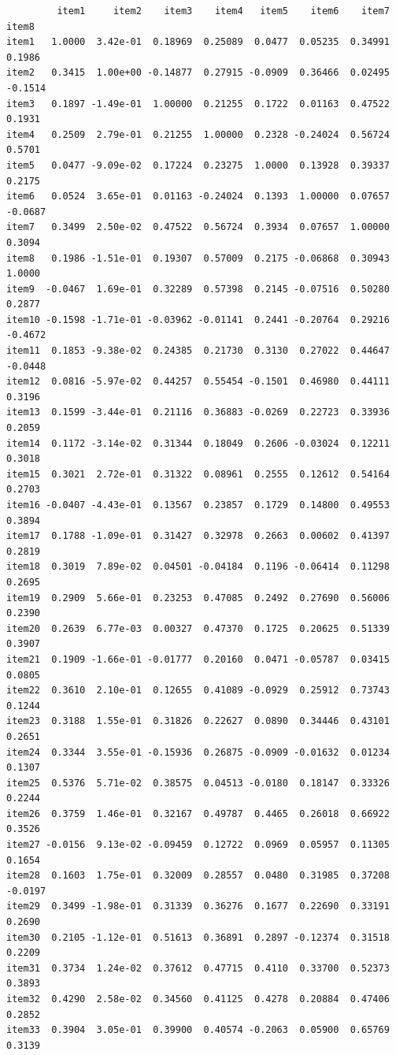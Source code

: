 \documentclass[
  a4paper,
]{ltjsbook}
\begin{document}
\begin{verbatim}
         item1     item2    item3    item4   item5    item6    item7   item8
item1   1.0000  3.42e-01  0.18969  0.25089  0.0477  0.05235  0.34991  0.1986
item2   0.3415  1.00e+00 -0.14877  0.27915 -0.0909  0.36466  0.02495 -0.1514
item3   0.1897 -1.49e-01  1.00000  0.21255  0.1722  0.01163  0.47522  0.1931
item4   0.2509  2.79e-01  0.21255  1.00000  0.2328 -0.24024  0.56724  0.5701
item5   0.0477 -9.09e-02  0.17224  0.23275  1.0000  0.13928  0.39337  0.2175
item6   0.0524  3.65e-01  0.01163 -0.24024  0.1393  1.00000  0.07657 -0.0687
item7   0.3499  2.50e-02  0.47522  0.56724  0.3934  0.07657  1.00000  0.3094
item8   0.1986 -1.51e-01  0.19307  0.57009  0.2175 -0.06868  0.30943  1.0000
item9  -0.0467  1.69e-01  0.32289  0.57398  0.2145 -0.07516  0.50280  0.2877
item10 -0.1598 -1.71e-01 -0.03962 -0.01141  0.2441 -0.20764  0.29216 -0.4672
item11  0.1853 -9.38e-02  0.24385  0.21730  0.3130  0.27022  0.44647 -0.0448
item12  0.0816 -5.97e-02  0.44257  0.55454 -0.1501  0.46980  0.44111  0.3196
item13  0.1599 -3.44e-01  0.21116  0.36883 -0.0269  0.22723  0.33936  0.2059
item14  0.1172 -3.14e-02  0.31344  0.18049  0.2606 -0.03024  0.12211  0.3018
item15  0.3021  2.72e-01  0.31322  0.08961  0.2555  0.12612  0.54164  0.2703
item16 -0.0407 -4.43e-01  0.13567  0.23857  0.1729  0.14800  0.49553  0.3894
item17  0.1788 -1.09e-01  0.31427  0.32978  0.2663  0.00602  0.41397  0.2819
item18  0.3019  7.89e-02  0.04501 -0.04184  0.1196 -0.06414  0.11298  0.2695
item19  0.2909  5.66e-01  0.23253  0.47085  0.2492  0.27690  0.56006  0.2390
item20  0.2639  6.77e-03  0.00327  0.47370  0.1725  0.20625  0.51339  0.3907
item21  0.1909 -1.66e-01 -0.01777  0.20160  0.0471 -0.05787  0.03415  0.0805
item22  0.3610  2.10e-01  0.12655  0.41089 -0.0929  0.25912  0.73743  0.1244
item23  0.3188  1.55e-01  0.31826  0.22627  0.0890  0.34446  0.43101  0.2651
item24  0.3344  3.55e-01 -0.15936  0.26875 -0.0909 -0.01632  0.01234  0.1307
item25  0.5376  5.71e-02  0.38575  0.04513 -0.0180  0.18147  0.33326  0.2244
item26  0.3759  1.46e-01  0.32167  0.49787  0.4465  0.26018  0.66922  0.3526
item27 -0.0156  9.13e-02 -0.09459  0.12722  0.0969  0.05957  0.11305  0.1654
item28  0.1603  1.75e-01  0.32009  0.28557  0.0480  0.31985  0.37208 -0.0197
item29  0.3499 -1.98e-01  0.31339  0.36276  0.1677  0.22690  0.33191  0.2690
item30  0.2105 -1.12e-01  0.51613  0.36891  0.2897 -0.12374  0.31518  0.2209
item31  0.3734  1.24e-02  0.37612  0.47715  0.4110  0.33700  0.52373  0.3893
item32  0.4290  2.58e-02  0.34560  0.41125  0.4278  0.20884  0.47406  0.2852
item33  0.3904  3.05e-01  0.39900  0.40574 -0.2063  0.05900  0.65769  0.3139

\end{verbatim}
\end{document}
